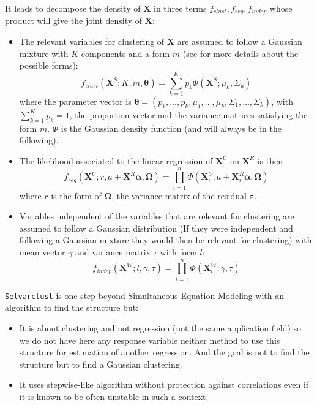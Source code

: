 \documentclass[12pt,a4paper]{report}
\begin{document}
It leads to decompose the density of $\boldsymbol{X}$ in three terms $f_{clust},f_{reg},f_{indep}$ whose product will give the joint density of $\boldsymbol{X}$:
\begin{itemize}
	\item The relevant variables for clustering of $\boldsymbol{X}$ are assumed to follow a Gaussian mixture with $K$ components and a form $m$ (see \cite{biernacki2006model} for more details about the possible forms):
	\begin{equation}
		f_{clust}(\boldsymbol{X}^S;K,m,\boldsymbol{\theta})=\sum_{k=1}^K p_k \Phi (\boldsymbol{X}^S;\mu_k,\Sigma_k) \nonumber 
	\end{equation}
	where the parameter vector is $\boldsymbol{\theta}=(p_1,\dots,p_k,\mu_1,\dots,\mu_k,\Sigma_1,\dots,\Sigma_k)$, with $\sum_{k=1}^K p_k=1$, the proportion vector and the variance matrices satisfying the form $m$. $\Phi$ is the Gaussian density function (and will always be in the following).
	\item The likelihood associated to the linear regression of $\boldsymbol{X}^U$ on $\boldsymbol{X}^R$ is then
	\begin{equation}
		f_{reg}(\boldsymbol{X}^U;r,a+\boldsymbol{X}^R\boldsymbol{\alpha},\boldsymbol{\Omega})=\prod_{i=1}^n \Phi(\boldsymbol{X}_i^U;a+\boldsymbol{X}_i^R \boldsymbol{\alpha},\boldsymbol{\Omega}) \nonumber 
	\end{equation}
	where $r$ is the form of $\boldsymbol{\Omega}$, the variance matrix of the residual $\boldsymbol{\varepsilon}$.
	\item Variables independent of the variables that are relevant for clustering are assumed to follow a Gaussian distribution (If they were independent and following a Gaussian mixture they would then be relevant for clustering) with mean vector $\gamma$ and variance matrix $\tau$ with form $l$:
	\begin{equation}
		f_{indep}(\boldsymbol{X}^{W};l,\gamma,\tau)=\prod_{i=1}^n \Phi (\boldsymbol{X}_i^W;\gamma,\tau) \nonumber 
	\end{equation}
\end{itemize}


{\tt Selvarclust} is one step beyond Simultaneous Equation Modeling with an algorithm to find the structure but:
			\begin{itemize}
				\item It is about clustering and not regression (not the same application field) so we do not have here any response variable neither method to use this structure for estimation of another regression.  And the goal is not to find the structure but to find a Gaussian clustering.
				\item It uses stepwise-like algorithm \cite{raftery2006variable} without protection against correlations even if it is known to be often unstable \cite{miller2002subset} in such a context.
			\end{itemize}
			
\end{document}
